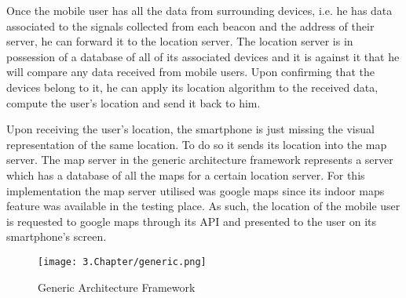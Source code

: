 Once the mobile user has all the data from surrounding devices, i.e. he has data associated to the signals collected from each beacon and the address of their server, he can forward it to the location server. The location server is in possession of a database of all of its associated devices and it is against it that he will compare any data received from mobile users. Upon confirming that the devices belong to it, he can apply its location algorithm to the received data, compute the user's location and send it back to him. 

Upon receiving the user's location, the smartphone is just missing the visual representation of the same location. To do so it sends its location into the map server. The map server in the generic architecture framework represents a server which has a database of all the maps for a certain location server. For this implementation the map server utilised was google maps since its indoor maps feature was available in the testing place. As such, the location of the mobile user is requested to google maps through its API and presented to the user on its smartphone's screen.



 \begin{figure}[H]
	\centering
		\texttt{[image: 3.Chapter/generic.png]}
	\caption[Generic Architecture Framework]{Generic Architecture Framework }
	\label{fig:solution}
\end{figure}